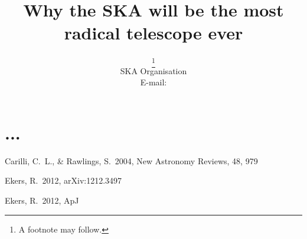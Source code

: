 \documentclass{PoS}
\title{Why the SKA will be the most radical telescope ever}
\author{\speaker{Tyler Bourke}\thanks{A footnote may follow.}\\
	SKA Organisation\\
        E-mail: \email{t.bourke@skatelescope.org}}
\newcommand\nar{New Astronomy Reviews}
\newcommand\apj{ApJ}
\begin{document}
\section{...}

\begin{thebibliography}{99}

 Carilli, C.~L., \& Rawlings, S.\
2004, \nar, 48, 979 

 Ekers, R.\ 2012, arXiv:1212.3497

 Ekers, R.\ 2012, \apj

\end{thebibliography}
\end{document}
